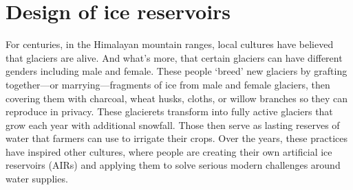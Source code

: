 \chapter{Design of ice reservoirs}

For centuries, in the Himalayan mountain ranges, local cultures have believed that glaciers are alive. And
what’s more, that certain glaciers can have different genders including male and female. These people ‘breed’
new glaciers by grafting together—or marrying—fragments of ice from male and female glaciers, then covering them
with charcoal, wheat husks, cloths, or willow branches so they can reproduce in privacy. These glacierets
transform into fully active glaciers that grow each year with additional snowfall. Those then serve as lasting
reserves of water that farmers can use to irrigate their crops. Over the years, these practices have inspired
other cultures, where people are creating their own artificial ice reservoirs (AIRs) and applying them to solve
serious modern challenges around water supplies.
